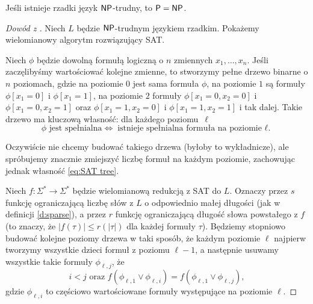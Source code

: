 \begin{theorem}[Mahaneya]\label{t:Mahaney}
    Jeśli istnieje rzadki język $\textsf{NP}$-trudny, to $\textsf{P} = \textsf{NP}$.
\end{theorem}
\begin{proof}[Dowód z \cite{Grochow16}]
    Niech $L$ będzie $\textsf{NP}$-trudnym językiem rzadkim. Pokażemy wielomianowy algorytm rozwiązujący SAT.

    Niech $\phi$ będzie dowolną formułą logiczną o $n$ zmiennych $x_1, \ldots, x_n$. Jeśli zaczęlibyśmy wartościować kolejne zmienne, to stworzymy pełne drzewo binarne o $n$ poziomach, gdzie na poziomie $0$ jest sama formuła $\phi$, na poziomie $1$ są formuły $\phi[x_1 \!=\! 0]$ i $\phi[x_1 \!=\! 1]$, na poziomie $2$ formuły $\phi[x_1 \!=\! 0, x_2 \!=\! 0]$ i $\phi[x_1 \!=\! 0, x_2 \!=\! 1]$ oraz $\phi[x_1 \!=\! 1, x_2 \!=\! 0]$ i $\phi[x_1 \!=\! 1, x_2 \!=\! 1]$ i tak dalej. Takie drzewo ma kluczową własność: dla każdego poziomu~$\ell$
    \begin{equation}\label{eq:SAT tree}
        \phi \text{ jest spełnialna} \iff \text{istnieje spełnialna formuła na poziomie $\ell$.}
    \end{equation}

    Oczywiście nie chcemy budować takiego drzewa (byłoby to wykładnicze), ale spróbujemy znacznie zmiejszyć liczbę formuł na każdym poziomie, zachowując jednak własność \ref{eq:SAT tree}.

    Niech $f : \Sigma^* \to \Sigma^*$ będzie wielomianową redukcją z SAT do $L$. Oznaczy przez $s$ funkcję ograniczającą liczbę słów z $L$ o odpowiednio małej długości (jak w definicji \ref{d:sparse}), a przez $r$ funkcję ograniczającą długość słowa powstałego z $f$ (to znaczy, że $|f(\tau)| \leq r(|\tau|)$ dla każdej formuły $\tau$).
    Będziemy stopniowo budować kolejne poziomy drzewa w taki sposób, że każdym poziomie $\ell$ najpierw tworzymy wszystkie dzieci formuł z poziomu $\ell - 1$, a następnie usuwamy wszystkie takie formuły $\phi_{\ell, j}$, że
    \[ i < j \text{ oraz } f(\phi_{\ell, 1} \lor \phi_{\ell, i}) = f(\phi_{\ell, 1} \lor \phi_{\ell, j}), \]
    gdzie $\phi_{\ell, i}$ to częściowo wartościowane formuły występujące na poziomie $\ell$.


\end{proof}
